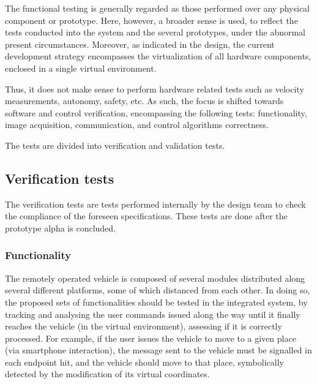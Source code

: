 The functional testing is generally regarded as those performed over any physical
component or prototype. Here, however, a broader sense is used, to reflect the
tests conducted into the system and the several prototypes, under the abnormal
present circumstances.
Moreover, as indicated in the design, the current development
strategy encompasses the virtualization of all hardware components, enclosed
in a single virtual environment.

Thus, it does not make sense to perform
hardware related tests such as velocity measurements, autonomy, safety, etc. As
such, the focus is shifted towards software and control verification,
encompassing the following tests: functionality, image acquisition,
communication, and control algorithms correctness.

The tests are divided into verification and validation tests.
\subsection{Verification tests}%
\label{sec:orge9c79e2}
The verification tests are tests performed internally by the design team to
check the compliance of the foreseen specifications. These tests are done after
the prototype alpha is concluded.

\subsubsection{Functionality}%
\label{sec:functionality}
The remotely operated vehicle is composed of several modules distributed along
several different platforms, some of which distanced from each other.
In doing so, the
proposed sets of functionalities should be tested in the integrated system, by
tracking and analysing the user commands issued along the way until it finally
reaches the vehicle (in the virtual environment), assessing if it is correctly
processed. For example, if the user issues the vehicle to move to a given place
(via smartphone interaction), the message sent to the vehicle must be signalled
in each endpoint hit, and the vehicle should move to that place, symbolically
detected by the modification of its virtual coordinates.

